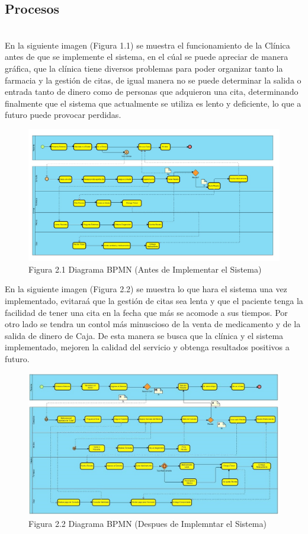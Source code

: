 \subsection{Procesos}
\\ 
En la siguiente imagen (Figura 1.1) se muestra el funcionamiento de la Cl\'inica antes de que se implemente el sistema, en el c\'ual se puede apreciar de manera gr\'afica, que la cl\'inica tiene diversos problemas para poder organizar tanto la farmacia y la gesti\'on de citas, de igual manera no se puede determinar la salida o entrada tanto de dinero como de personas que adquieron una cita, determinando finalmente que el sistema que actualmente se utiliza es lento y deficiente, lo que a futuro puede provocar perdidas.
\begin{figure}[htbp!]
		\includegraphics[width=1\textwidth]{images/bpm1}
		\caption{Figura 2.1 Diagrama BPMN (Antes de Implementar el Sistema)}
	\end{figure}
	\newpage
	En la siguiente imagen (Figura 2.2) se muestra lo que hara el sistema una vez implementado, evitara\'a que la gesti\'on de citas sea lenta y que el paciente tenga la facilidad de tener una cita en la fecha que m\'as se acomode a sus tiempos. Por otro lado se tendra un contol m\'as minuscioso de la venta de medicamento y de la salida de dinero de Caja. De esta manera se busca que la cl\'inica y el sistema implementado, mejoren la calidad del servicio y obtenga resultados positivos a futuro. 
	\begin{figure}[htbp!]
		\includegraphics[width=1\textwidth]{images/diagramabpm}
		\caption{Figura 2.2 Diagrama BPMN (Despues de Implemntar el Sistema)}
	\end{figure}
\newpage
